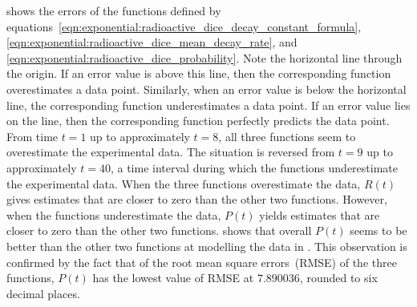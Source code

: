 \documentclass[a4paper,oneside,12pt]{article}
\begin{document}
\begin{problem}
{\begin{solution}
 shows the errors of
the functions defined by
equations~\eqref{eqn:exponential:radioactive_dice_decay_constant_formula},
\eqref{eqn:exponential:radioactive_dice_mean_decay_rate}, and
\eqref{eqn:exponential:radioactive_dice_probability}.  Note the
horizontal line through the origin.  If an error value is above this
line, then the corresponding function overestimates a data point.
Similarly, when an error value is below the horizontal line, the
corresponding function underestimates a data point.  If an error value
lies on the line, then the corresponding function perfectly predicts
the data point.  From time $t = 1$ up to approximately $t = 8$, all
three functions seem to overestimate the experimental data.  The
situation is reversed from $t = 9$ up to approximately $t = 40$, a
time interval during which the functions underestimate the
experimental data.  When the three functions overestimate the data,
$R(t)$ gives estimates that are closer to zero than the other two
functions.  However, when the functions underestimate the data, $P(t)$
yields estimates that are closer to zero than the other two
functions.   shows
that overall $P(t)$ seems to be better than the other two functions at
modelling the data in .  This
observation is confirmed by the fact that of the root mean square
errors~(RMSE) of the three functions, $P(t)$ has the lowest value of
RMSE at $7.890036$, rounded to six decimal places.
\end{solution}
}{}

\begin{table}[!htbp]
\centering

\caption{%
  The radioactive decay of a sample of $4.0291$ grams of aluminium.
  The sample was neutron activated for $30$ minutes.  Then a Geiger
  counter was used to measure the number of remaining radioactive
  isotopes after the listed numbers of seconds.  The experiment was
  performed by Steven Sahyun of the University of Wisconsin at
  Whitewater, USA on $13$-th January~$2005$.
}
\label{tab:exponential:aluminium_radioactive_decay}
\end{table}


\end{problem}
\end{document}
